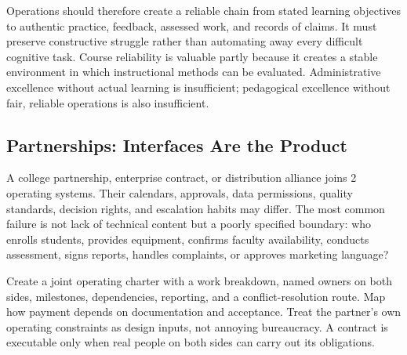 Operations should therefore create a reliable chain from stated learning objectives to authentic practice, feedback, assessed work, and records of claims. It must preserve constructive struggle rather than automating away every difficult cognitive task. Course reliability is valuable partly because it creates a stable environment in which instructional methods can be evaluated. Administrative excellence without actual learning is insufficient; pedagogical excellence without fair, reliable operations is also insufficient.

\subsection{Partnerships: Interfaces Are the Product}
\label{sec:arch_partnerships}

A college partnership, enterprise contract, or distribution alliance joins 2 operating systems. Their calendars, approvals, data permissions, quality standards, decision rights, and escalation habits may differ. The most common failure is not lack of technical content but a poorly specified boundary: who enrolls students, provides equipment, confirms faculty availability, conducts assessment, signs reports, handles complaints, or approves marketing language?

Create a joint operating charter with a work breakdown, named owners on both sides, milestones, dependencies, reporting, and a conflict-resolution route. Map how payment depends on documentation and acceptance. Treat the partner's own operating constraints as design inputs, not annoying bureaucracy. A contract is executable only when real people on both sides can carry out its obligations.

